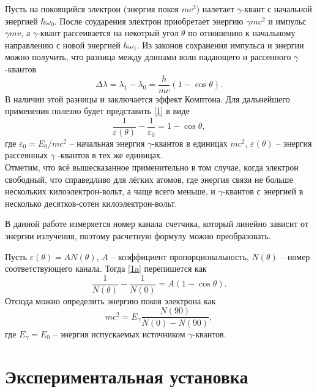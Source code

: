 \documentclass[a4paper,12pt]{article} %
\begin{document}
    Пусть на покоящийся электрон (энергия покоя $mc^2$) налетает $\gamma$-квант с начальной энергией $\hbar \omega_0$.
    После соударения электрон приобретает энергию $\gamma mc^2$ и импульс $\gamma mv$, а $\gamma$-квант рассеивается на некотрый угол $\theta$ по отношению к начальному направлению с новой энергией $\hbar \omega_1$. 
    Из законов сохранения импульса и энергии можно получить, что разница между длинами волн падающего и рассенного $\gamma$-квантов
    \begin{equation}\label{1}
      \Delta \lambda = \lambda_1 - \lambda_0 = \dfrac{h}{mc} (1-\cos \theta).
    \end{equation}
    В наличии этой разницы и заключается эффект Комптона. 
    Для дальнейшего применения полезно будет представить \eqref{1} в виде
    \[\tag{1a}\label{1a}
    \dfrac{1}{\varepsilon(\theta)} - \dfrac{1}{\varepsilon_0} = 1 - \cos \theta,
    \]
    где $\varepsilon_0 = E_0/mc^2$ -- начальная энергия $\gamma$-квантов в единицах $mc^2$, $\varepsilon(\theta)$ -- энергия рассеянных $\gamma$ -квантов в тех же единицах.\\
    Отметим, что всё вышесказанное применительно в том случае, когда электрон свободный, что справедливо для лёгких атомов, где энергия связи не больше нескольких килоэлектрон-вольт, а чаще всего меньше, и $\gamma$-квантов с энергией в несколько десятков-сотен килоэлектрон-вольт.\par
    В данной работе измеряется номер канала счетчика, который линейно зависит от энергии излучения, поэтому расчетную формулу можно преобразовать.\par
    Пусть $\varepsilon(\theta) = AN(\theta)$, $A$ -- коэффициент пропорциональность, $N(\theta)$ -- номер соответствующего канала. Тогда \eqref{1a} перепишется как
    \[\tag{1b}\label{1b}
    \dfrac{1}{N(\theta)} - \dfrac{1}{N(0)} = A(1-\cos \theta).\]
    Отсюда можно определить энергию покоя электрона как 
    \begin{equation}\label{2}
      mc^2 = E_\gamma \dfrac{N(90)}{N(0) - N(90)},
    \end{equation}
    где $E_\gamma = E_0$ -- энергия испускаемых источником $\gamma$-квантов.

  \section{Экспериментальная установка}
    
\end{document}
